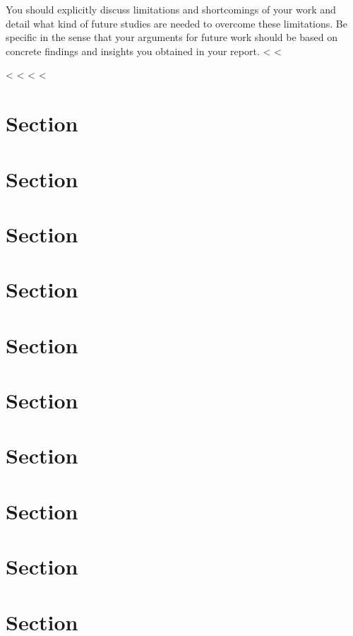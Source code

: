 {{{{You should explicitly discuss limitations and shortcomings of your work and detail what kind of future studies are needed to overcome these limitations.
Be specific in the sense that your arguments for future work should be based on concrete findings and insights you obtained in your report.
<%
<%

<%
\label{sec:loremipsum}
\lipsum[1-4]
<%
<%
<%
\label{chap:label}
\lipsum[3]

\resetchapterfooter

\section{Section}
\label{sec:loremipsum}
\lipsum[1-4]
\section{Section}
\section{Section}
\section{Section}
\section{Section}
\section{Section}
\section{Section}
\section{Section}
\section{Section}
\section{Section}
\lipsum
}}}}
